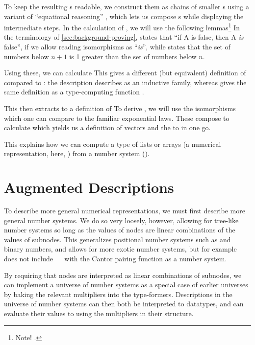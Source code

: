 To keep the resulting s readable, we construct them as chains of smaller s using a variant of ``equational reasoning'' \cite{agdastdlib, plfa}, which lets us compose s while displaying the intermediate steps. In the calculation of , we will use the following lemmas\footnote{Note! .}
In the terminology of \autoref{sec:background-proving},  states that ``if A is false, then A \emph{is} false'', if we allow reading isomorphisms as ``\emph{is}'', while  states that the set of numbers below $n+1$ is 1 greater than the set of numbers below $n$.

Using these, we can calculate
This gives a different (but equivalent) definition of  compared to : the description  describes  as an inductive family, whereas  gives the same definition as a type-computing function \cite{progorn}.

This  then extracts to a definition of 
To derive , we will use the isomorphisms
which one can compare to the familiar exponential laws. These compose to calculate
which yields us a definition of vectors
and the  to  in one go.

This explains how we can compute a type of lists or arrays (a numerical representation, here, ) from a number system (\bN{}).


\section{Augmented Descriptions}
To describe more general numerical representations, we must first describe more general number systems. We do so very loosely, however, allowing for tree-like number systems so long as the values of nodes are linear combinations of the values of subnodes. This generalizes positional number systems such as \bN{} and binary numbers, and allows for more exotic number systems, but for example does not include \bN{}\ \ \bN{} with the Cantor pairing function as a number system.

By requiring that nodes are interpreted as linear combinations of subnodes, we can implement a universe of number systems as a special case of earlier universes by baking the relevant multipliers into the type-formers. Descriptions in the universe of number systems can then both be interpreted to datatypes, and can evaluate their values to \bN{} using the multipliers in their structure.

